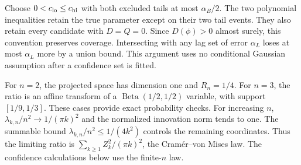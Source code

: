 Choose $0<c_{\rm lo}\le c_{\rm hi}$ with both excluded tails at most $\alpha_B/2$. The two polynomial inequalities retain the true parameter except on their two tail events. They also retain every candidate with $D=Q=0$. Since $D(\phi)>0$ almost surely, this convention preserves coverage. Intersecting with any lag set of error $\alpha_L$ loses at most $\alpha_L$ more by a union bound. This argument uses no conditional Gaussian assumption after a confidence set is fitted.

For $n=2$, the projected space has dimension one and $R_n=1/4$. For $n=3$, the ratio is an affine transform of a $\operatorname{Beta}(1/2,1/2)$ variable, with support $[1/9,1/3]$. These cases provide exact probability checks. For increasing $n$, $\lambda_{k,n}/n^2\to1/(\pi k)^2$ and the normalized innovation norm tends to one. The summable bound $\lambda_{k,n}/n^2\le1/(4k^2)$ controls the remaining coordinates. Thus the limiting ratio is $\sum_{k\ge1}Z_k^2/(\pi k)^2$, the Cram\'er--von Mises law. The confidence calculations below use the finite-$n$ law.


